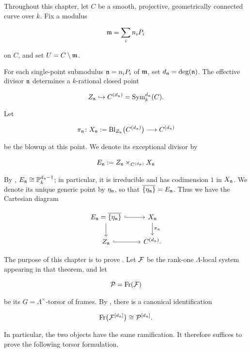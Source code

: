 Throughout this chapter, let $C$ be a smooth, projective, geometrically connected
curve over $k$. Fix a modulus

\[
    \mathfrak{m} = \sum_i n_i P_i
\]

on $C$, and set $U = C \setminus \mathfrak{m}$.

For each single-point submodulus $\mathfrak{n} = n_i P_i$ of $\mathfrak{m}$, set
$d_{\mathfrak{n}} = \deg(\mathfrak{n})$. The effective divisor $\mathfrak{n}$ determines a
$k$-rational closed point

\[
    Z_{\mathfrak{n}} \hookrightarrow C^{(d_{\mathfrak{n}})}
        = \operatorname{Sym}^{d_{\mathfrak{n}}}_k(C).
\]

Let

\[
    \pi_{\mathfrak{n}} \colon
    X_{\mathfrak{n}} := \operatorname{Bl}_{Z_{\mathfrak{n}}}\bigl(C^{(d_{\mathfrak{n}})}\bigr)
    \longrightarrow C^{(d_{\mathfrak{n}})}
\]

be the blowup at this point. We denote its exceptional divisor by

\[
    E_{\mathfrak{n}} := Z_{\mathfrak{n}} \times_{C^{(d_{\mathfrak{n}})}} X_{\mathfrak{n}}
\]

By
,
$E_{\mathfrak{n}}\cong\mathbb P_k^{d_{\mathfrak{n}}-1}$; in particular, it is irreducible and
has codimension $1$ in $X_{\mathfrak{n}}$. We denote its unique generic point by
$\eta_{\mathfrak{n}}$, so that $\overline{\{\eta_{\mathfrak{n}}\}}=E_{\mathfrak{n}}$. Thus we have the
Cartesian diagram

\begin{equation}\label{equation:blowup_diagram_ndls}
\begin{tikzcd}
E_\ndls = \overline{\{\eta_\ndls\}}
    \arrow[r, hook] \arrow[d]
  & X_\ndls \arrow[d, "\pi_\ndls"] \\
Z_\ndls \arrow[r, hook]
  & C^{(d_\ndls)}.
\end{tikzcd}
\end{equation}

The purpose of this chapter is to prove
. Let $\mathcal{F}$ be
the rank-one $\Lambda$-local system appearing in that theorem, and let

\[
    \mathcal{P} = \operatorname{Fr}(\mathcal{F})
\]

be its $G = \Lambda^\times$-torsor of frames. By
,
there is a canonical identification

\[
    \operatorname{Fr}\bigl(\mathcal{F}^{[d_{\mathfrak{n}}]}\bigr)
        \cong \mathcal{P}^{[d_{\mathfrak{n}}]}.
\]

In particular, the two objects have the same ramification. It therefore
suffices to prove the following torsor formulation.

